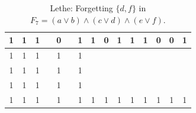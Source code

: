 \begin{table}[!tb]
\begin{tabular}{|c|c|c|c|c|c|c|c|c|c|c|c|c|c|c|}
        \rowcolor{yellow!40} 1 & 1 & 1 &  & 0 &  & 1 & 1 & 0 & 1 & 1 & 1 & 0 & 0 & 1 \\ \hline
        \rowcolor{gray!40} 1 & 1 & 1 &  & 1 &  & 1 &  &  &  &  &  &  &  &  \\ \hline
        \rowcolor{gray!40} 1 & 1 & 1 &  & 1 &  & 1 &  &  &  &  &  &  &  &  \\ \hline
        \rowcolor{gray!40} 1 & 1 & 1 &  & 1 &  & 1 &  &  &  &  &  &  &  &  \\ \hline
        \rowcolor{gray!40} 1 & 1 & 1 &  & 1 &  & 1 & 1 & 1 & 1 & 1 & 1 & 1 & 1 & 1 \\ \hline
    \end{tabular}
    \caption{Lethe: Forgetting $\{d, f\}$ in $F_{7} = (a \lor b) \land (c \lor d) \land (e \lor f)$.}
    \label{tab:lethe-F7-df}
\end{table}

